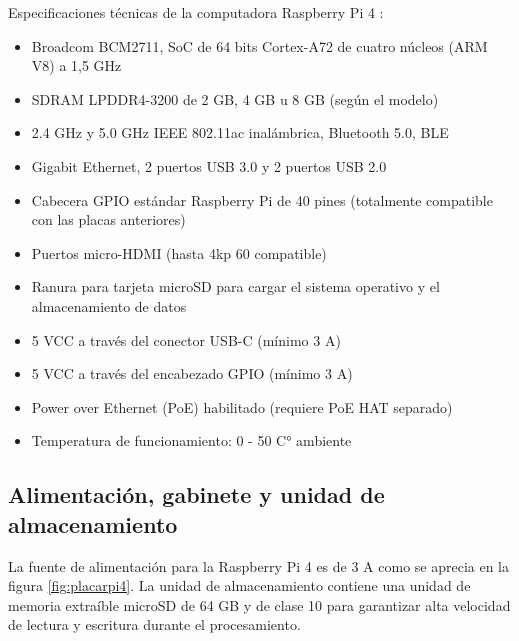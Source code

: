 
\vspace{1cm}

Especificaciones técnicas de la computadora Raspberry Pi 4 \citep{WEBSITE:7}:

\begin{itemize}
\item Broadcom BCM2711, SoC de 64 bits Cortex-A72 de cuatro núcleos (ARM V8) a 1,5 GHz
\item SDRAM LPDDR4-3200 de 2 GB, 4 GB u 8 GB (según el modelo)
\item 2.4 GHz y 5.0 GHz IEEE 802.11ac inalámbrica, Bluetooth 5.0, BLE
\item Gigabit Ethernet, 2 puertos USB 3.0 y 2 puertos USB 2.0 
\item Cabecera GPIO estándar Raspberry Pi de 40 pines (totalmente compatible con las placas anteriores)
\item Puertos micro-HDMI (hasta 4kp 60 compatible)
\item Ranura para tarjeta microSD para cargar el sistema operativo y el almacenamiento de datos
\item 5 VCC a través del conector USB-C (mínimo 3 A)
\item 5 VCC a través del encabezado GPIO (mínimo 3 A)
\item Power over Ethernet (PoE) habilitado (requiere PoE HAT separado)
\item Temperatura de funcionamiento: 0 - 50 C° ambiente
\end{itemize}

\subsection{Alimentación, gabinete y unidad de almacenamiento}

La fuente de alimentación para la Raspberry Pi 4 es de 3 A como se aprecia en la figura \ref{fig:placarpi4}. La unidad de almacenamiento contiene una unidad de memoria extraíble microSD de 64 GB y de clase 10 para garantizar alta velocidad de lectura y escritura durante el procesamiento.

